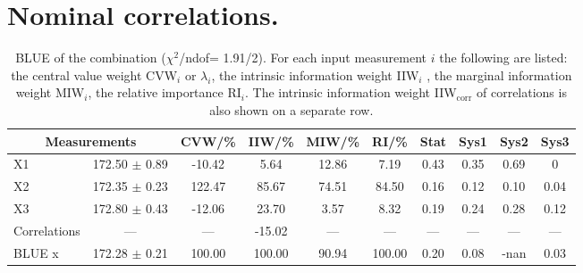 \section{Nominal correlations.}
\begin{table}[H]
\scriptsize
\begin{center}
\renewcommand{\arraystretch}{1.1}
\begin{tabular}{|lc|c|c|c|c|cccc|}
\hline
\multicolumn{2}{|c|}{Measurements} & CVW/\%  & IIW/\%  & MIW/\%  & RI/\%  & {\tiny Stat} & {\tiny Sys1} & {\tiny Sys2} & {\tiny Sys3}\\
\hline
X1 &     172.50 $\pm$       0.89 &     -10.42 &       5.64 &      12.86 &       7.19 &       0.43 &       0.35 &       0.69 &  0\\
X2 &     172.35 $\pm$       0.23 &     122.47 &      85.67 &      74.51 &      84.50 &       0.16 &       0.12 &       0.10 &       0.04\\
X3 &     172.80 $\pm$       0.43 &     -12.06 &      23.70 &       3.57 &       8.32 &       0.19 &       0.24 &       0.28 &       0.12\\
Correlations & --- & --- &     -15.02 & --- & --- & --- & --- & --- & ---\\
\hline
BLUE {\tiny x} &     172.28 $\pm$       0.21 &     100.00 &     100.00 &      90.94 &     100.00 &       0.20 &       0.08 &       -nan &       0.03\\
\hline
\end{tabular}
\caption{BLUE of the combination ($\chi^2$/ndof=      1.91/2).
 For each input measurement $i$ the following are listed: the central value weight CVW$_i$ or $\lambda_i$, the intrinsic information weight IIW$_i$ , the marginal information weight MIW$_i$, the relative importance RI$_i$. The intrinsic information weight IIW$_{\mathrm{corr}}$ of correlations is also shown on a separate row.}
\renewcommand{\arraystretch}{1}
\end{center}
\end{table}
